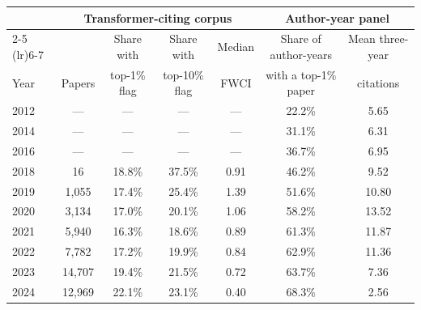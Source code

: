\begin{tabular}{lcccccc}
\toprule
 & \multicolumn{4}{c}{Transformer-citing corpus} & \multicolumn{2}{c}{Author-year panel} \\
\cmidrule(lr){2-5} \cmidrule(lr){6-7}
 & & Share with & Share with & Median & Share of author-years & Mean three-year \\
Year & Papers & top-1\% flag & top-10\% flag & FWCI & with a top-1\% paper & citations \\
\midrule
2012 & --- & --- & --- & --- & 22.2\% & 5.65 \\
2014 & --- & --- & --- & --- & 31.1\% & 6.31 \\
2016 & --- & --- & --- & --- & 36.7\% & 6.95 \\
2018 & 16 & 18.8\% & 37.5\% & 0.91 & 46.2\% & 9.52 \\
2019 & 1,055 & 17.4\% & 25.4\% & 1.39 & 51.6\% & 10.80 \\
2020 & 3,134 & 17.0\% & 20.1\% & 1.06 & 58.2\% & 13.52 \\
2021 & 5,940 & 16.3\% & 18.6\% & 0.89 & 61.3\% & 11.87 \\
2022 & 7,782 & 17.2\% & 19.9\% & 0.84 & 62.9\% & 11.36 \\
2023 & 14,707 & 19.4\% & 21.5\% & 0.72 & 63.7\% & 7.36 \\
2024 & 12,969 & 22.1\% & 23.1\% & 0.40 & 68.3\% & 2.56 \\
\bottomrule
\end{tabular}
